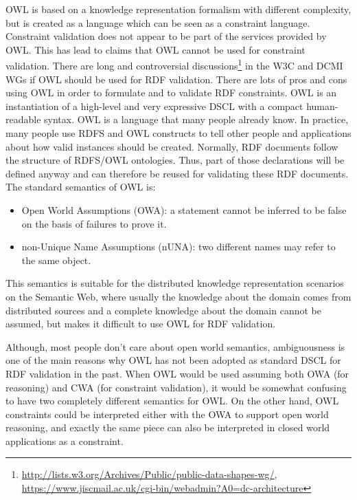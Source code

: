 \documentclass{llncs}
\begin{document}
OWL is based on a knowledge representation formalism with different complexity, but is created as a language which can be seen as a constraint language.
Constraint validation does not appear to be part of the services provided by OWL.  
This has lead to claims that OWL cannot be used for constraint validation. 
There are long and controversial discussions\footnote{\url{http://lists.w3.org/Archives/Public/public-data-shapes-wg/}, \url{https://www.jiscmail.ac.uk/cgi-bin/webadmin?A0=dc-architecture}} in the W3C and DCMI WGs if OWL should be used for RDF validation.
There are lots of pros and cons using OWL in order to formulate and to validate RDF constraints.
OWL is an instantiation of a high-level and very expressive DSCL with a compact human-readable syntax.
OWL is a language that many people already know.
In practice, many people use RDFS and OWL constructs to tell other people and applications about how valid instances should be created.
Normally, RDF documents follow the structure of RDFS/OWL ontologies. 
Thus, part of those declarations will be defined anyway and can therefore be reused for validating these RDF documents.
The standard semantics of OWL is:

\begin{itemize}
	\item Open World Assumptions (OWA): a statement cannot be inferred to be false on the basis of failures to prove it.
  \item non-Unique Name Assumptions (nUNA): two different names may refer to the same object.
\end{itemize}

This semantics is suitable for the distributed knowledge representation scenarios on the Semantic Web, 
where usually the knowledge about the domain comes from distributed
sources and a complete knowledge about the domain cannot be assumed, 
but makes it difficult to use OWL for RDF validation.

Although, most people don’t care about open world semantics, 
ambiguousness is one of the main reasons why OWL has not been adopted as standard DSCL for RDF validation in the past. 
When OWL would be used assuming both OWA (for reasoning) and CWA (for constraint validation),
it would be somewhat confusing to have two completely different semantics for OWL.
On the other hand, OWL constraints could be interpreted either with the OWA to support open
world reasoning, and exactly the same piece can also be interpreted in closed world
applications as a constraint. 
\end{document}
